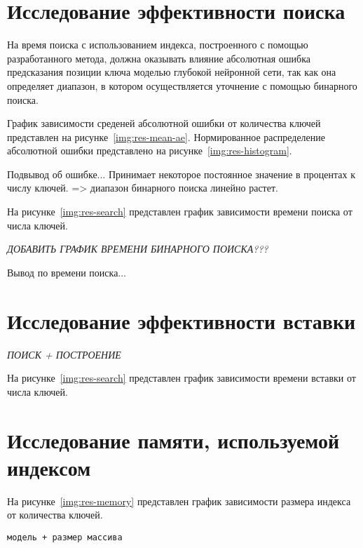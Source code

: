 \section{Исследование эффективности поиска}

На время поиска с использованием индекса, построенного с помощью разработанного
метода, должна оказывать влияние абсолютная ошибка предсказания позиции ключа
моделью глубокой нейронной сети, так как она определяет диапазон, в котором
осуществляется уточнение с помощью бинарного поиска.

График зависимости среденей абсолютной ошибки от количества ключей представлен
на рисунке~\ref{img:res-mean-ae}. Нормированное распределение абсолютной ошибки
представлено на рисунке~\ref{img:res-histogram}.

Подвывод об ошибке... Принимает некоторое постоянное значение в процентах к
числу ключей. => диапазон бинарного поиска линейно растет.

На рисунке~\ref{img:res-search} представлен график зависимости времени поиска от
числа ключей.

\textit{ДОБАВИТЬ ГРАФИК ВРЕМЕНИ БИНАРНОГО ПОИСКА???}

Вывод по времени поиска...

\section{Исследование эффективности вставки}

\textit{ПОИСК + ПОСТРОЕНИЕ}

На рисунке~\ref{img:res-search} представлен график зависимости времени вставки
от числа ключей.

\section{Исследование памяти, используемой индексом}

На рисунке~\ref{img:res-memory} представлен график зависимости размера индекса
от количества ключей.

\texttt{модель + размер массива}
